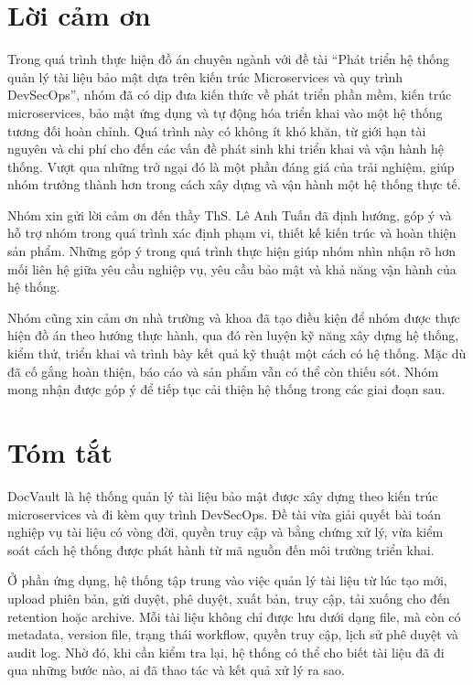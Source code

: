 

\chapter*{Lời cảm ơn}

Trong quá trình thực hiện đồ án chuyên ngành với đề tài ``Phát triển hệ thống quản lý tài liệu bảo mật dựa trên kiến trúc Microservices và quy trình DevSecOps'', nhóm đã có dịp đưa kiến thức về phát triển phần mềm, kiến trúc microservices, bảo mật ứng dụng và tự động hóa triển khai vào một hệ thống tương đối hoàn chỉnh. Quá trình này có không ít khó khăn, từ giới hạn tài nguyên và chi phí cho đến các vấn đề phát sinh khi triển khai và vận hành hệ thống. Vượt qua những trở ngại đó là một phần đáng giá của trải nghiệm, giúp nhóm trưởng thành hơn trong cách xây dựng và vận hành một hệ thống thực tế.

Nhóm xin gửi lời cảm ơn đến thầy ThS. Lê Anh Tuấn đã định hướng, góp ý và hỗ trợ nhóm trong quá trình xác định phạm vi, thiết kế kiến trúc và hoàn thiện sản phẩm. Những góp ý trong quá trình thực hiện giúp nhóm nhìn nhận rõ hơn mối liên hệ giữa yêu cầu nghiệp vụ, yêu cầu bảo mật và khả năng vận hành của hệ thống.

Nhóm cũng xin cảm ơn nhà trường và khoa đã tạo điều kiện để nhóm được thực hiện đồ án theo hướng thực hành, qua đó rèn luyện kỹ năng xây dựng hệ thống, kiểm thử, triển khai và trình bày kết quả kỹ thuật một cách có hệ thống. Mặc dù đã cố gắng hoàn thiện, báo cáo và sản phẩm vẫn có thể còn thiếu sót. Nhóm mong nhận được góp ý để tiếp tục cải thiện hệ thống trong các giai đoạn sau.

\clearpage

\chapter*{Tóm tắt}

DocVault là hệ thống quản lý tài liệu bảo mật được xây dựng theo kiến trúc microservices và đi kèm quy trình DevSecOps. Đề tài vừa giải quyết bài toán nghiệp vụ tài liệu có vòng đời, quyền truy cập và bằng chứng xử lý, vừa kiểm soát cách hệ thống được phát hành từ mã nguồn đến môi trường triển khai.

Ở phần ứng dụng, hệ thống tập trung vào việc quản lý tài liệu từ lúc tạo mới, upload phiên bản, gửi duyệt, phê duyệt, xuất bản, truy cập, tải xuống cho đến retention hoặc archive. Mỗi tài liệu không chỉ được lưu dưới dạng file, mà còn có metadata, version file, trạng thái workflow, quyền truy cập, lịch sử phê duyệt và audit log. Nhờ đó, khi cần kiểm tra lại, hệ thống có thể cho biết tài liệu đã đi qua những bước nào, ai đã thao tác và kết quả xử lý ra sao.

